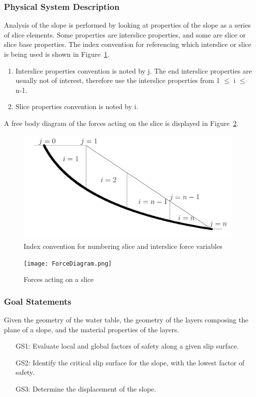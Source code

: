 \documentclass[12pt]{article}
\begin{document}
\subsubsection{Physical System Description}
\label{Sec:PhysSystDesc}
Analysis of the slope is performed by looking at properties of the slope as a series of slice elements. Some properties are interslice properties, and some are slice or slice base properties. The index convention for referencing which interslice or slice is being used is shown in Figure~\ref{Figure:Indeconvfornumbslicandinteforcvari}.
\begin{enumerate}
\item{Interslice properties convention is noted by j. The end interslice properties are usually not of interest, therefore use the interslice properties from 1 $\leq{}$ i $\leq{}$ n-1.}
\item{Slice properties convention is noted by i.}
\end{enumerate}
A free body diagram of the forces acting on the slice is displayed in Figure~\ref{Figure:Forcactionaslic}.
\begin{figure}
\begin{center}
\includegraphics{IndexConvention.png}
\caption{Index convention for numbering slice and interslice force variables}
\label{Figure:Indeconvfornumbslicandinteforcvari}
\end{center}
\end{figure}
\begin{figure}
\begin{center}
\texttt{[image: ForceDiagram.png]}
\caption{Forces acting on a slice}
\label{Figure:Forcactionaslic}
\end{center}
\end{figure}
\subsubsection{Goal Statements}
\label{Sec:GoalStat}
Given the geometry of the water table, the geometry of the layers composing the plane of a slope, and the material properties of the layers.
\begin{itemize}
\item[GS1:]Evaluate local and global factors of safety along a given slip surface.
\item[GS2:]Identify the critical slip surface for the slope, with the lowest factor of safety.
\item[GS3:]Determine the displacement of the slope.
\end{itemize}
\end{document}
